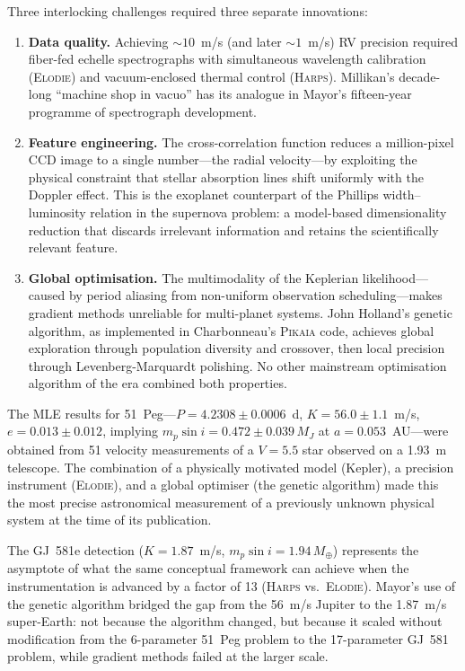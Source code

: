 \documentclass[12pt]{article}
\begin{document}
Three interlocking challenges required three separate innovations:
\begin{enumerate}
  \item \textbf{Data quality.}  Achieving $\sim 10$~m/s (and later
    $\sim 1$~m/s) RV precision required fiber-fed echelle spectrographs
    with simultaneous wavelength calibration (\textsc{Elodie}) and
    vacuum-enclosed thermal control (\textsc{Harps}).  Millikan's
    decade-long ``machine shop in vacuo'' has its analogue in Mayor's
    fifteen-year programme of spectrograph development.

  \item \textbf{Feature engineering.}  The cross-correlation function
    reduces a million-pixel CCD image to a single number---the radial
    velocity---by exploiting the physical constraint that stellar
    absorption lines shift uniformly with the Doppler effect.  This is
    the exoplanet counterpart of the Phillips width--luminosity relation
    in the supernova problem: a model-based dimensionality reduction that
    discards irrelevant information and retains the scientifically
    relevant feature.

  \item \textbf{Global optimisation.}  The multimodality of the
    Keplerian likelihood---caused by period aliasing from non-uniform
    observation scheduling---makes gradient methods unreliable for
    multi-planet systems.  John Holland's genetic algorithm, as
    implemented in Charbonneau's \textsc{Pikaia} code, achieves global
    exploration through population diversity and crossover, then local
    precision through Levenberg-Marquardt polishing.  No other
    mainstream optimisation algorithm of the era combined both
    properties.
\end{enumerate}

The MLE results for 51~Peg---$P = 4.2308 \pm 0.0006$~d,
$K = 56.0 \pm 1.1$~m/s, $e = 0.013 \pm 0.012$, implying
$m_p\sin i = 0.472 \pm 0.039\,M_J$ at $a = 0.053$~AU---were
obtained from 51 velocity measurements of a $V = 5.5$ star observed
on a 1.93~m telescope.  The combination of a physically motivated
model (Kepler), a precision instrument (\textsc{Elodie}), and a
global optimiser (the genetic algorithm) made this the most precise
astronomical measurement of a previously unknown physical system at
the time of its publication.

The GJ~581e detection ($K = 1.87$~m/s, $m_p\sin i = 1.94\,M_\oplus$)
represents the asymptote of what the same conceptual framework can
achieve when the instrumentation is advanced by a factor of 13
(\textsc{Harps} vs.\ \textsc{Elodie}).  Mayor's use of the genetic
algorithm bridged the gap from the 56~m/s Jupiter to the 1.87~m/s
super-Earth: not because the algorithm changed, but because it scaled
without modification from the 6-parameter 51~Peg problem to the
17-parameter GJ~581 problem, while gradient methods failed at the
larger scale.
\end{document}
